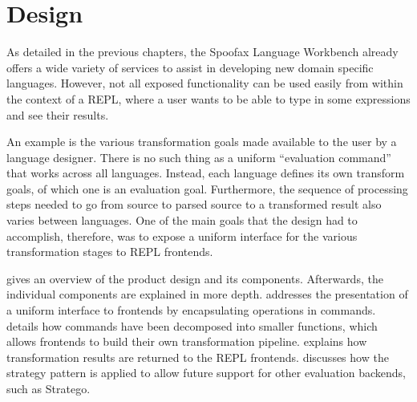 \chapter{Design}
\label{cha:design}

As detailed in the previous chapters, the Spoofax Language Workbench already
offers a wide variety of services to assist in developing new domain specific
languages. However, not all exposed functionality can be used easily from within
the context of a REPL, where a user wants to be able to type in some expressions
and see their results.

An example is the various transformation goals made available to the user by a
language designer. There is no such thing as a uniform ``evaluation command''
that works across all languages. Instead, each language defines its own
transform goals, of which one is an evaluation goal. Furthermore, the sequence
of processing steps needed to go from source to parsed source to a transformed
result also varies between languages. One of the main goals that the design had to
accomplish, therefore, was to expose a uniform interface for the various
transformation stages to REPL frontends.

 gives an overview of the product design and its components.
Afterwards, the individual components are explained in more depth.
 addresses the presentation of a uniform interface to
frontends by encapsulating operations in commands. 
details how commands have been decomposed into smaller functions, which allows
frontends to build their own transformation pipeline. 
explains how transformation results are returned to the REPL frontends.
 discusses how the strategy pattern is applied to allow
future support for other evaluation backends, such as Stratego.











